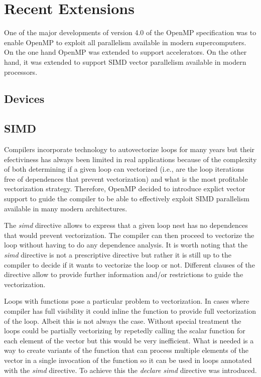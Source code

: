 \section{Recent Extensions}
\label{sec:recent_extensions}

One of the major developments of version 4.0 of the OpenMP specification was to enable OpenMP to exploit all parallelism available in modern supercomputers. On the one hand OpenMP was extended to support accelerators. On the other hand, it was extended to support SIMD vector parallelism available in modern processors. 

\subsection{Devices}
\label{sub:devices}

\subsection{SIMD}
\label{sub:simd}

Compilers incorporate technology to autovectorize loops for many years but their efectiviness has always been limited in real applications because of the complexity of both determining if a given loop can vectorized (i.e., are the loop iterations free of dependences that prevent vectorization) and what is the most profitable vectorization strategy. Therefore, OpenMP decided to introduce explict vector support to guide the compiler to be able to effectively exploit SIMD parallelism available in many modern architectures.

The \emph{simd} directive allows to express that a given loop nest has no dependences that would prevent vectorization. The compiler can then proceed to vectorize the loop without having to do any dependence analysis. It is worth noting that the \emph{simd} directive is not a prescriptive directive but rather it is still up to the compiler to decide if it wants to vectorize the loop or not. Different clauses of the directive allow to provide further information and/or restrictions to guide the vectorization.

Loops with functions pose a particular problem to vectorization. In cases where compiler has full visibility it could inline the function to provide full vectorization of the loop. Albeit this is not always the case. Without special treatment the loops could be partially vectorizing by repetedly calling the scalar function for each element of the vector but this would be very inefficient. What is needed is a way to create variants of the function that can process multiple elements of the vector in a single invocation of the function so it can be used in loops annotated with the \emph{simd} directive. To achieve this the \emph{declare simd} directive was introduced. %


